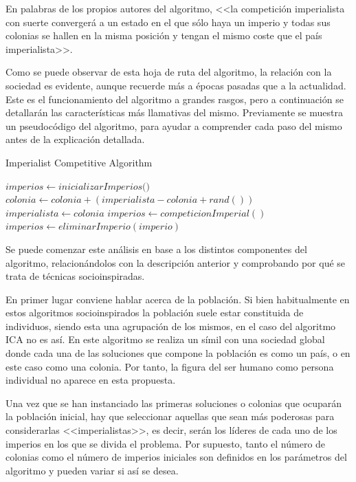 En palabras de los propios autores del algoritmo, <<la competición imperialista con suerte convergerá a un estado en el que sólo haya un imperio y todas sus colonias se hallen en la misma posición y tengan el mismo coste que el país imperialista>>.

Como se puede observar de esta hoja de ruta del algoritmo, la relación con la sociedad es evidente, aunque recuerde más a épocas pasadas que a la actualidad. Este es el funcionamiento del algoritmo a grandes rasgos, pero a continuación se detallarán las características más llamativas del mismo. Previamente se muestra un pseudocódigo del algoritmo, para ayudar a comprender cada paso del mismo antes de la explicación detallada.

\begin{algorithm}
	\caption{Imperialist Competitive Algorithm}
	\begin{algorithmic}[1]
		\State $imperios \gets \textit{inicializarImperios()}$
		\State $colonia \gets colonia + (imperialista - colonia + rand())$
		\State $imperialista \gets colonia$
		\EndIf
		\EndFor
		\State $imperios \gets competicionImperial()$
		\State $imperios \gets eliminarImperio(imperio)$
		\EndIf
		\EndWhile
	\end{algorithmic}
\end{algorithm}

Se puede comenzar este análisis en base a los distintos componentes del algoritmo, relacionándolos con la descripción anterior y comprobando por qué se trata de técnicas socioinspiradas.

En primer lugar conviene hablar acerca de la población. Si bien habitualmente en estos algoritmos socioinspirados la población suele estar constituida de individuos, siendo esta una agrupación de los mismos, en el caso del algoritmo ICA no es así. En este algoritmo se realiza un símil con una sociedad global donde cada una de las soluciones que compone la población es como un país, o en este caso como una colonia. Por tanto, la figura del ser humano como persona individual no aparece en esta propuesta.

Una vez que se han instanciado las primeras soluciones o colonias que ocuparán la población inicial, hay que seleccionar aquellas que sean más poderosas para considerarlas <<imperialistas>>, es decir, serán los líderes de cada uno de los imperios en los que se divida el problema. Por supuesto, tanto el número de colonias como el número de imperios iniciales son definidos en los parámetros del algoritmo y pueden variar si así se desea.

